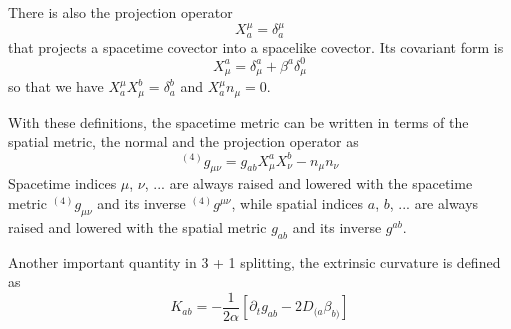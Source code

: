 \documentclass[letterpaper,nofootinbib,prd,amsmath,onecolumn]{revtex4-1}
\begin{document}
There is also the projection operator
\begin{equation}\label{projection 1}
X^{\mu}_{a} = \delta^{\mu}_{a}
\end{equation}
that projects a spacetime covector into a spacelike covector. Its covariant form is
\begin{equation}\label{projection 2}
X^{a}_{\mu} = \delta^{a}_{\mu} + \beta^{a}\delta^{0}_{\mu}
\end{equation}
so that we have $X^{\mu}_{a}X^{b}_{\mu} = \delta^{b}_{a}$ and $X^{\mu}_{a}n_{\mu} = 0$. 

With these definitions, the spacetime metric can be written in terms of the spatial metric, the normal and the projection operator as
\begin{equation}\label{spacetime metric 3 + 1}
^{(4)}g_{\mu\nu} = g_{ab}X^{a}_{\mu}X^{b}_{\nu} - n_{\mu}n_{\nu}
\end{equation}
Spacetime indices $\mu$, $\nu$, ... are always raised and lowered with the spacetime metric $^{(4)}g_{\mu\nu}$ and its inverse $^{(4)}g^{\mu\nu}$, while spatial indices $a$, $b$, ... are always raised and lowered with the spatial metric $g_{ab}$ and its inverse $g^{ab}$. 

Another important quantity in 3 + 1 splitting, the extrinsic curvature is defined as
\begin{equation}\label{extrinsic}
K_{ab} = - \frac{1}{2\alpha}\left[\partial_{t}g_{ab} - 2D_{(a}\beta_{b)}\right]
\end{equation}

\end{document}
